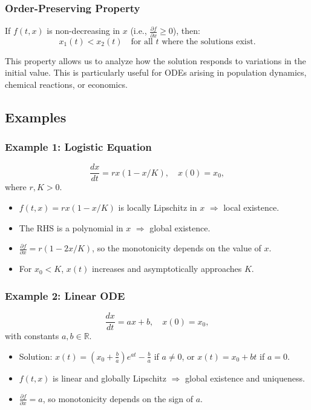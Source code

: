 \subsubsection*{Order-Preserving Property}
If $f(t, x)$ is non-decreasing in $x$ (i.e., $\frac{\partial f}{\partial x} \geq 0$), then:
\[x_1(t) < x_2(t) \quad \text{for all } t \text{ where the solutions exist.}\]

This property allows us to analyze how the solution responds to variations in the initial value. This is particularly useful for ODEs arising in population dynamics, chemical reactions, or economics.

\subsection{Examples}

\subsubsection*{Example 1: Logistic Equation}
\begin{equation*}
\frac{dx}{dt} = rx(1 - x/K), \quad x(0) = x_0,
\end{equation*}
where $r, K > 0$.

\begin{itemize}
  \item $f(t,x) = rx(1 - x/K)$ is locally Lipschitz in $x$ $\Rightarrow$ local existence.
  \item The RHS is a polynomial in $x$ $\Rightarrow$ global existence.
  \item $\frac{\partial f}{\partial x} = r(1 - 2x/K)$, so the monotonicity depends on the value of $x$.
  \item For $x_0 < K$, $x(t)$ increases and asymptotically approaches $K$.
\end{itemize}

\subsubsection*{Example 2: Linear ODE}
\begin{equation*}
\frac{dx}{dt} = ax + b, \quad x(0) = x_0,
\end{equation*}
with constants $a, b \in \mathbb{R}$.

\begin{itemize}
  \item Solution: $x(t) = (x_0 + \frac{b}{a})e^{at} - \frac{b}{a}$ if $a \neq 0$, or $x(t) = x_0 + bt$ if $a = 0$.
  \item $f(t,x)$ is linear and globally Lipschitz $\Rightarrow$ global existence and uniqueness.
  \item $\frac{\partial f}{\partial x} = a$, so monotonicity depends on the sign of $a$.
\end{itemize}

